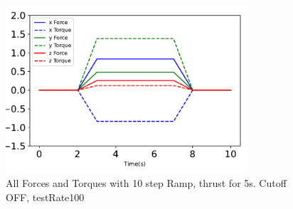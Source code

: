 \begin{figure}[htbp]\centerline{\includegraphics[width=0.8\textwidth]{AutoTeX/Ramp_10steps_CutoffOFF_5s_testRate100}}\caption{All Forces and Torques with 10 step Ramp, thrust for 5s. Cutoff OFF, testRate100}\label{fig:Ramp_10steps_CutoffOFF_5s_testRate100}\end{figure}